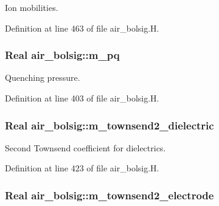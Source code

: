 Ion mobilities. 



Definition at line 463 of file air\+\_\+bolsig.\+H.

\subsubsection[{\texorpdfstring{m\+\_\+pq}{m_pq}}]{\setlength{\rightskip}{0pt plus 5cm}Real air\+\_\+bolsig\+::m\+\_\+pq\hspace{0.3cm}{\ttfamily [protected]}}\hypertarget{classair__bolsig_a554b273425dd186393461759096283ef}{}\label{classair__bolsig_a554b273425dd186393461759096283ef}


Quenching pressure. 



Definition at line 403 of file air\+\_\+bolsig.\+H.

\subsubsection[{\texorpdfstring{m\+\_\+townsend2\+\_\+dielectric}{m_townsend2_dielectric}}]{\setlength{\rightskip}{0pt plus 5cm}Real air\+\_\+bolsig\+::m\+\_\+townsend2\+\_\+dielectric\hspace{0.3cm}{\ttfamily [protected]}}\hypertarget{classair__bolsig_a6945cbd06dc3718e9f8a1cd833570104}{}\label{classair__bolsig_a6945cbd06dc3718e9f8a1cd833570104}


Second Townsend coefficient for dielectrics. 



Definition at line 423 of file air\+\_\+bolsig.\+H.

\subsubsection[{\texorpdfstring{m\+\_\+townsend2\+\_\+electrode}{m_townsend2_electrode}}]{\setlength{\rightskip}{0pt plus 5cm}Real air\+\_\+bolsig\+::m\+\_\+townsend2\+\_\+electrode\hspace{0.3cm}{\ttfamily [protected]}}\hypertarget{classair__bolsig_aa024b1721750a7dbf9b54d9b541c17e2}{}\label{classair__bolsig_aa024b1721750a7dbf9b54d9b541c17e2}


